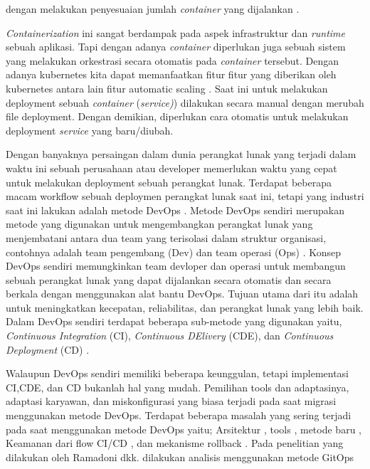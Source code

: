 dengan melakukan penyesuaian jumlah \textit{container} yang  dijalankan \cite{Singh2017}.
\par
\textit{Containerization} \cite{davidbritch} ini sangat berdampak pada aspek infrastruktur dan \textit{runtime} sebuah aplikasi.
Tapi dengan adanya \textit{container} diperlukan juga sebuah  sistem yang melakukan orkestrasi secara otomatis pada \textit{container} tersebut.
Dengan  adanya kubernetes kita dapat memanfaatkan fitur fitur yang diberikan oleh kubernetes antara lain fitur automatic scaling \cite{Leila2018, kubernetes_2021}.
Saat ini untuk melakukan  deployment sebuah \textit{container} (\textit{service)}) dilakukan secara manual dengan merubah file deployment.
Dengan demikian, diperlukan cara otomatis untuk melakukan deployment \textit{service} yang baru/diubah.
\par
Dengan banyaknya persaingan dalam dunia perangkat lunak yang terjadi dalam waktu ini sebuah perusahaan
atau developer memerlukan waktu yang cepat untuk melakukan deployment sebuah perangkat lunak. Terdapat beberapa macam
workflow sebuah deploymen perangkat lunak saat ini, tetapi yang industri saat ini lakukan adalah metode DevOps \cite{Bass2018}.
Metode DevOps sendiri merupakan metode yang digunakan untuk mengembangkan perangkat lunak yang
menjembatani antara dua team yang terisolasi dalam struktur organisasi, contohnya adalah team pengembang (Dev)
dan team operasi (Ops) \cite{Bolscher2019}. Konsep DevOps \cite{Bass2018} sendiri memungkinkan team devloper dan operasi
untuk membangun sebuah perangkat lunak yang dapat dijalankan secara otomatis dan secara berkala dengan menggunakan alat bantu DevOps.
Tujuan utama dari itu adalah untuk meningkatkan kecepatan, reliabilitas, dan perangkat lunak yang lebih baik.
Dalam DevOps sendiri terdapat beberapa sub-metode yang digunakan yaitu, \textit{Continuous Integration} (CI), \textit{Continuous DElivery} (CDE),
dan \textit{Continuous Deployment} (CD)  \cite{phoenix2013}.
\par
Walaupun DevOps sendiri memiliki beberapa keunggulan, tetapi implementasi CI,CDE, dan CD bukanlah hal yang mudah.
Pemilihan tools dan adaptasinya, adaptasi karyawan, dan miskonfigurasi yang biasa terjadi pada saat migrasi menggunakan metode DevOps.
\newpage
Terdapat beberapa masalah yang sering terjadi pada saat menggunakan metode DevOps yaitu; Arsitektur \cite{Bolscher2019},
tools \cite{Proulx2018}, metode baru  \cite{Abbass2019, Leite2019}, Keamanan dari flow CI/CD \cite{Shahin2017}, dan mekanisme rollback \cite{Fritzsch2019}.
Pada penelitian yang dilakukan oleh Ramadoni dkk. \cite{Ramadoni2021} dilakukan analisis menggunakan metode GitOps
